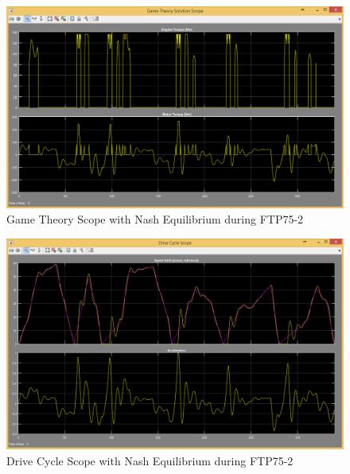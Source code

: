 
\begin{figure}[h]
\centering
\includegraphics[scale=0.4]{figures/NashEquilibrium/FTP75-2/gameTheory13Juni}
\caption{Game Theory Scope with Nash Equilibrium during FTP75-2}
\label{fig:gtne2}
\end{figure}

\begin{figure}[h]
\centering
\includegraphics[scale=0.4]{figures/NashEquilibrium/FTP75-2/driveCycle13Juni}
\caption{Drive Cycle Scope with Nash Equilibrium during FTP75-2}
\label{fig:dcne2}
\end{figure}

